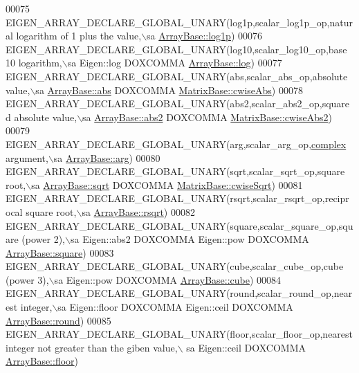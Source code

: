 \begin{DoxyCode}
00075   EIGEN\_ARRAY\_DECLARE\_GLOBAL\_UNARY(log1p,scalar\_log1p\_op,natural logarithm of 1 plus the value,\(\backslash\)sa 
      \hyperlink{group___core___module_a438640146f3e7488f09a4f60c305b1d9}{ArrayBase::log1p})
00076   EIGEN\_ARRAY\_DECLARE\_GLOBAL\_UNARY(log10,scalar\_log10\_op,base 10 logarithm,\(\backslash\)sa Eigen::log DOXCOMMA 
      \hyperlink{group___core___module_a7748ba1f6891fa4e10723a8bf77b8770}{ArrayBase::log})
00077   EIGEN\_ARRAY\_DECLARE\_GLOBAL\_UNARY(abs,scalar\_abs\_op,absolute value,\(\backslash\)sa 
      \hyperlink{group___core___module_a5efe92eb15ea504206269a2a19b9878c}{ArrayBase::abs} DOXCOMMA \hyperlink{group___core___module_a8f2dbd5d9573c79c5dd356ddb29a0ee9}{MatrixBase::cwiseAbs})
00078   EIGEN\_ARRAY\_DECLARE\_GLOBAL\_UNARY(abs2,scalar\_abs2\_op,squared absolute value,\(\backslash\)sa 
      \hyperlink{group___core___module_ad213e9822777ff03219eed7063c26971}{ArrayBase::abs2} DOXCOMMA \hyperlink{group___core___module_a60808fcf09547e14952957bbdf75d3c6}{MatrixBase::cwiseAbs2})
00079   EIGEN\_ARRAY\_DECLARE\_GLOBAL\_UNARY(arg,scalar\_arg\_op,\hyperlink{structcomplex}{complex} argument,\(\backslash\)sa 
      \hyperlink{group___core___module_a38ad76c91fa4dcb1daae506098b30ae5}{ArrayBase::arg})
00080   EIGEN\_ARRAY\_DECLARE\_GLOBAL\_UNARY(sqrt,scalar\_sqrt\_op,square root,\(\backslash\)sa 
      \hyperlink{group___core___module_aef292634cdf57e09ee29c758deff8251}{ArrayBase::sqrt} DOXCOMMA \hyperlink{group___core___module_a8ceab546dd934174888bea8b7514ea47}{MatrixBase::cwiseSqrt})
00081   EIGEN\_ARRAY\_DECLARE\_GLOBAL\_UNARY(rsqrt,scalar\_rsqrt\_op,reciprocal square root,\(\backslash\)sa 
      \hyperlink{group___core___module_aa978767ac25c6d708d7ac41524f75252}{ArrayBase::rsqrt})
00082   EIGEN\_ARRAY\_DECLARE\_GLOBAL\_UNARY(square,scalar\_square\_op,square (power 2),\(\backslash\)sa Eigen::abs2 DOXCOMMA 
      Eigen::pow DOXCOMMA \hyperlink{group___core___module_a95c818b933d73944c53bf0226ea106c8}{ArrayBase::square})
00083   EIGEN\_ARRAY\_DECLARE\_GLOBAL\_UNARY(cube,scalar\_cube\_op,cube (power 3),\(\backslash\)sa Eigen::pow DOXCOMMA 
      \hyperlink{group___core___module_ab49fda99c455624b18410b9af0be71ec}{ArrayBase::cube})
00084   EIGEN\_ARRAY\_DECLARE\_GLOBAL\_UNARY(round,scalar\_round\_op,nearest integer,\(\backslash\)sa Eigen::floor DOXCOMMA 
      Eigen::ceil DOXCOMMA \hyperlink{group___core___module_a354b5032ab3852a015a55b4dbf257d3d}{ArrayBase::round})
00085   EIGEN\_ARRAY\_DECLARE\_GLOBAL\_UNARY(floor,scalar\_floor\_op,nearest integer not greater than the giben value,\(\backslash\)
      sa Eigen::ceil DOXCOMMA \hyperlink{group___core___module_a1dbd24e0b04ddd157436086266f917fd}{ArrayBase::floor})

\end{DoxyCode}
